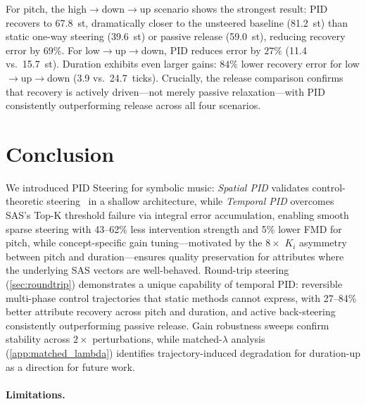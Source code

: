 \documentclass{article}
\theoremstyle{plain}
\begin{document}
For pitch, the high$\to$down$\to$up scenario shows the strongest result: PID recovers to 67.8~st, dramatically closer to the unsteered baseline (81.2~st) than static one-way steering (39.6~st) or passive release (59.0~st), reducing recovery error by $69\%$. For low$\to$up$\to$down, PID reduces error by $27\%$ (11.4 vs.\ 15.7~st). Duration exhibits even larger gains: $84\%$ lower recovery error for low$\to$up$\to$down (3.9 vs.\ 24.7~ticks). Crucially, the release comparison confirms that recovery is actively driven---not merely passive relaxation---with PID consistently outperforming release across all four scenarios.

\section{Conclusion}
\label{sec:conclusion}

We introduced PID Steering for symbolic music: \emph{Spatial PID} validates control-theoretic steering~\cite{nguyen2026pid} in a shallow architecture, while \emph{Temporal PID} overcomes SAS's Top-K threshold failure via integral error accumulation, enabling smooth sparse steering with 43--62\% less intervention strength and 5\% lower FMD for pitch, while concept-specific gain tuning---motivated by the $8{\times}$ $K_i$ asymmetry between pitch and duration---ensures quality preservation for attributes where the underlying SAS vectors are well-behaved. Round-trip steering (\cref{sec:roundtrip}) demonstrates a unique capability of temporal PID: reversible multi-phase control trajectories that static methods cannot express, with 27--84\% better attribute recovery across pitch and duration, and active back-steering consistently outperforming passive release. Gain robustness sweeps confirm stability across $2{\times}$ perturbations, while matched-$\lambda$ analysis (\cref{app:matched_lambda}) identifies trajectory-induced degradation for duration-up as a direction for future work.

\paragraph{Limitations.}
\end{document}

